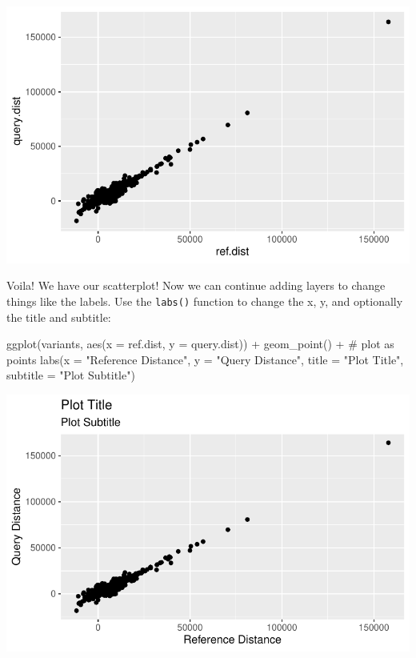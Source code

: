 \documentclass[
  letterpaper,
  DIV=11,
  numbers=noendperiod]{scrreprt}
\newenvironment{Shaded}{\begin{snugshade}}{\end{snugshade}}
\newcommand{\AttributeTok}[1]{\textcolor[rgb]{0.40,0.45,0.13}{#1}}
\newcommand{\CommentTok}[1]{\textcolor[rgb]{0.37,0.37,0.37}{#1}}
\newcommand{\FunctionTok}[1]{\textcolor[rgb]{0.28,0.35,0.67}{#1}}
\newcommand{\NormalTok}[1]{\textcolor[rgb]{0.00,0.23,0.31}{#1}}
\newcommand{\SpecialCharTok}[1]{\textcolor[rgb]{0.37,0.37,0.37}{#1}}
\newcommand{\StringTok}[1]{\textcolor[rgb]{0.13,0.47,0.30}{#1}}
\begin{document}
\includegraphics{scripts/02_dataViz/class3_files/figure-pdf/unnamed-chunk-10-1.pdf}

Voila! We have our scatterplot! Now we can continue adding layers to
change things like the labels. Use the \texttt{labs()} function to
change the x, y, and optionally the title and subtitle:

\begin{Shaded}
\begin{Highlighting}[]
\FunctionTok{ggplot}\NormalTok{(variants, }\FunctionTok{aes}\NormalTok{(}\AttributeTok{x =}\NormalTok{ ref.dist, }\AttributeTok{y =}\NormalTok{ query.dist)) }\SpecialCharTok{+}
  \FunctionTok{geom\_point}\NormalTok{() }\SpecialCharTok{+} \CommentTok{\# plot as points}
  \FunctionTok{labs}\NormalTok{(}\AttributeTok{x =} \StringTok{"Reference Distance"}\NormalTok{,}
       \AttributeTok{y =} \StringTok{"Query Distance"}\NormalTok{,}
       \AttributeTok{title =} \StringTok{"Plot Title"}\NormalTok{,}
       \AttributeTok{subtitle =} \StringTok{"Plot Subtitle"}\NormalTok{)}
\end{Highlighting}
\end{Shaded}

\includegraphics{scripts/02_dataViz/class3_files/figure-pdf/unnamed-chunk-11-1.pdf}
\end{document}

